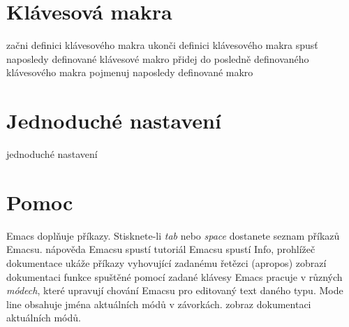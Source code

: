 \section{Klávesová makra}

 začni definici klávesového makra
 ukonči definici klávesového makra
 spusť naposledy definované klávesové makro
 přidej do posledně definovaného klávesového makra
 pojmenuj naposledy definované makro

\section{Jednoduché nastavení}

 jednoduché nastavení

\section{Pomoc}

Emacs doplňuje příkazy. Stisknete-li  {\it tab\/} nebo {\it
space\/} dostanete seznam příkazů Emacsu.
\askip
{} nápověda Emacsu
 spustí tutoriál Emacsu
 spustí Info, prohlížeč dokumentace
 ukáže příkazy vyhovující zadanému řetězci (apropos)
 zobrazí dokumentaci funkce spuštěné pomocí zadané klávesy
\askip
Emacs pracuje v různých {\it módech}, které upravují chování
Emacsu pro editovaný text daného typu. Mode line obsahuje jména aktuálních
módů v závorkách.
\askip
{} zobraz dokumentaci aktuálních módů.

\copyrightnotice

\bye

